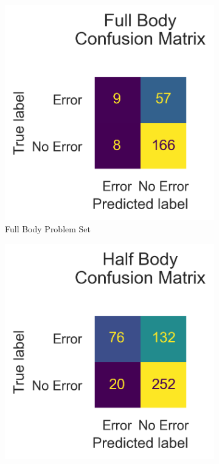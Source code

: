 \begin{figure}[htbp]
  \centering
  \begin{subfigure}[b]{0.4\linewidth}
      \centering
      \includegraphics[width=\textwidth]{figures/Results_lo/v2/confusion/full_together.png}
      \caption[]{Full Body Problem Set}
      \label{fig:fb_conf}
  \end{subfigure}
  \hfill
  \begin{subfigure}[b]{0.4\linewidth}
      \centering
      \includegraphics[width=\textwidth]{figures/Results_lo/v2/confusion/half_together.png}

\end{subfigure}
\end{figure}
